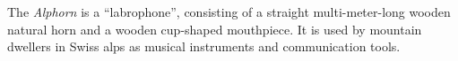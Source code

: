 The \emph{Alphorn} is a ``labrophone'', consisting of a straight multi-meter-long wooden natural horn and a wooden cup-shaped mouthpiece.
It is used by mountain dwellers in Swiss alps as musical instruments and communication tools.